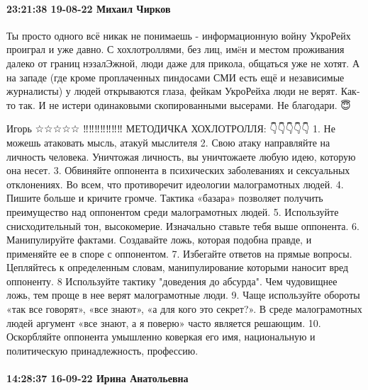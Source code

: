  
 
 
 
 

\paragraph{23:21:38 19-08-22 Михаил Чирков}

Ты просто одного всё никак не понимаешь - информационную войну УкроРейх проиграл и уже давно.
С хохлотроллями, без лиц, имëн и местом проживания далеко от границ нэзалЭжной, люди даже для прикола, общаться уже не хотят.
А на западе (где кроме проплаченных пиндосами СМИ есть ещё и независимые журналисты) у людей открываются глаза, фейкам УкроРейха люди не верят.
Как-то так.
И не истери одинаковыми скопированными высерами.
Не благодари. 😇


Игорь ☆☆☆☆☆
‼️‼️‼️‼️‼️‼️‼️
МЕТОДИЧКА ХОХЛОТРОЛЛЯ:
👇👇👇👇👇
1. Не можешь атаковать мысль, атакуй мыслителя
2. Свою атаку направляйте на личность человека. Уничтожая личность, вы уничтожаете любую идею, которую она несет.
3. Обвиняйте оппонента в психических заболеваниях и сексуальных отклонениях. Во всем, что противоречит идеологии малограмотных людей.
4. Пишите больше и кричите громче. Тактика «базара» позволяет получить преимущество над оппонентом среди малограмотных людей.
5. Используйте снисходительный тон, высокомерие. Изначально ставьте тебя выше оппонента.
6. Манипулируйте фактами. Создавайте ложь, которая подобна правде, и применяйте ее в споре с оппонентом.
7. Избегайте ответов на прямые вопросы. Цепляйтесь к определенным словам, манипулирование которыми наносит вред оппоненту.
8 Используйте тактику "доведения до абсурда". Чем чудовищнее ложь, тем проще в нее верят малограмотные люди.
9. Чаще используйте обороты «так все говорят», «все знают», «а для кого это секрет?». В среде малограмотных людей аргумент «все знают, а я поверю» часто является решающим.
10. Оскорбляйте оппонента умышленно коверкая его имя, национальную и политическую принадлежность, профессию.

\paragraph{14:28:37 16-09-22 Ирина Анатольевна}

